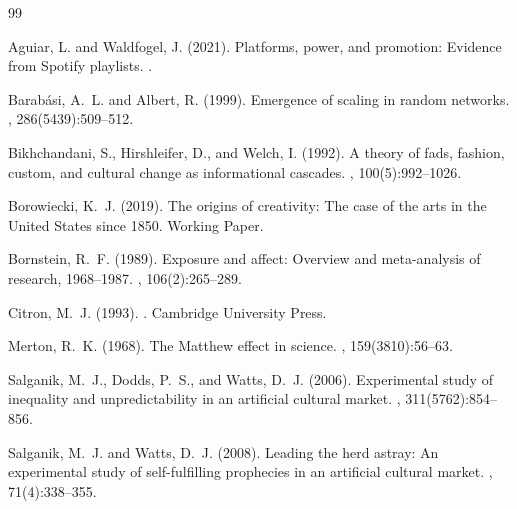 \documentclass[11pt,a4paper]{article}
\begin{document}



\begin{thebibliography}{99}

Aguiar, L. and Waldfogel, J. (2021).
\newblock Platforms, power, and promotion: Evidence from Spotify playlists.
.

Barab\'{a}si, A.~L. and Albert, R. (1999).
\newblock Emergence of scaling in random networks.
, 286(5439):509--512.

Bikhchandani, S., Hirshleifer, D., and Welch, I. (1992).
\newblock A theory of fads, fashion, custom, and cultural change as informational cascades.
, 100(5):992--1026.

Borowiecki, K.~J. (2019).
\newblock The origins of creativity: The case of the arts in the {United States} since 1850.
\newblock Working Paper.

Bornstein, R.~F. (1989).
\newblock Exposure and affect: Overview and meta-analysis of research, 1968--1987.
, 106(2):265--289.

Citron, M.~J. (1993).
.
\newblock Cambridge University Press.

Merton, R.~K. (1968).
\newblock The {Matthew} effect in science.
, 159(3810):56--63.

Salganik, M.~J., Dodds, P.~S., and Watts, D.~J. (2006).
\newblock Experimental study of inequality and unpredictability in an artificial cultural market.
, 311(5762):854--856.

Salganik, M.~J. and Watts, D.~J. (2008).
\newblock Leading the herd astray: An experimental study of self-fulfilling prophecies in an artificial cultural market.
, 71(4):338--355.


\end{thebibliography}
\end{document}
